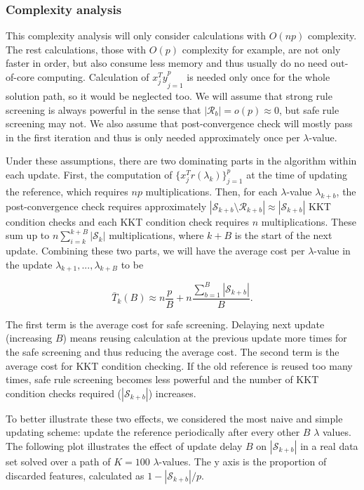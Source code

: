 \documentclass{article}
\begin{document}
\subsubsection{Complexity analysis}

This complexity analysis will only consider calculations with $O(np)$ complexity. The rest calculations, those with $O(p)$ complexity for example, are not only faster in order, but also consume less memory and thus usually do no need out-of-core computing. Calculation of ${x_j^Ty}_{j=1}^p$ is needed only once for the whole solution path, so it would be neglected too. We will assume that strong rule screening is always powerful in the sense that $|\mathcal{R}_b|=o(p)\approx0$, but safe rule screening may not. We also assume that post-convergence check will mostly pass in the first iteration and thus is only needed approximately once per $\lambda$-value.

Under these assumptions, there are two dominating parts in the algorithm within each update. First, the computation of $\{x_j^Tr(\lambda_k)\}_{j=1}^p$ at the time of updating the reference, which requires $np$ multiplications. Then, for each $\lambda$-value $\lambda_{k+b}$, the post-convergence check requires approximately $|\mathcal{S}_{k+b}\setminus\mathcal{R}_{k+b}|\approx|\mathcal{S}_{k+b}|$ KKT condition checks and each KKT condition check requires $n$ multiplications. These sum up to $n\sum_{i=k}^{k+B}|\mathcal{S}_k|$ multiplications, where $k+B$ is the start of the next update. Combining these two parts, we will have the average cost per $\lambda$-value in the update $\lambda_{k+1},...,\lambda_{k+B}$ to be

\begin{equation}
    \bar{T}_k(B) \approx n\frac{p}{B}+n\frac{\sum_{b=1}^B|\mathcal{S}_{k+b}|}{B}.
\end{equation}

The first term is the average cost for safe screening. Delaying next update (increasing $B$) means reusing calculation at the previous update more times for the safe screening and thus reducing the average cost. The second term is the average cost for KKT condition checking. If the old reference is reused too many times, safe rule screening becomes less powerful and the number of KKT condition checks required ($|\mathcal{S}_{k+b}|$) increases.

To better illustrate these two effects, we considered the most naive and simple updating scheme: update the reference periodically after every other $B$ $\lambda$ values. The following plot illustrates the effect of update delay $B$ on $|\mathcal{S}_{k+b}|$ in a real data set solved over a path of $K=100$ $\lambda$-values. The y axis is the proportion of discarded features, calculated as $1-|\mathcal{S}_{k+b}|/p$.
\end{document}
